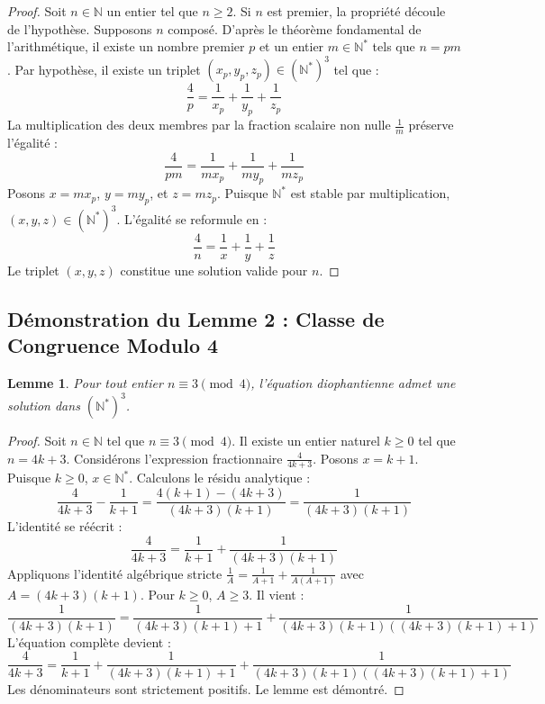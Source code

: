\documentclass[12pt,a4paper]{article}
\newtheorem{lemma}{Lemme}
\begin{document}
\begin{proof}
Soit $n \in \mathbb{N}$ un entier tel que $n \geq 2$.
Si $n$ est premier, la propriété découle de l'hypothèse.
Supposons $n$ composé. D'après le théorème fondamental de l'arithmétique, il existe un nombre premier $p$ et un entier $m \in \mathbb{N}^*$ tels que $n = p m$.
Par hypothèse, il existe un triplet $(x_p, y_p, z_p) \in (\mathbb{N}^*)^3$ tel que :
\begin{equation}
\frac{4}{p} = \frac{1}{x_p} + \frac{1}{y_p} + \frac{1}{z_p}
\end{equation}
La multiplication des deux membres par la fraction scalaire non nulle $\frac{1}{m}$ préserve l'égalité :
\begin{equation}
\frac{4}{pm} = \frac{1}{m x_p} + \frac{1}{m y_p} + \frac{1}{m z_p}
\end{equation}
Posons $x = m x_p$, $y = m y_p$, et $z = m z_p$. Puisque $\mathbb{N}^*$ est stable par multiplication, $(x, y, z) \in (\mathbb{N}^*)^3$. L'égalité se reformule en :
\begin{equation}
\frac{4}{n} = \frac{1}{x} + \frac{1}{y} + \frac{1}{z}
\end{equation}
Le triplet $(x, y, z)$ constitue une solution valide pour $n$.
\end{proof}

\subsection{Démonstration du Lemme 2 : Classe de Congruence Modulo 4}

\begin{lemma}
Pour tout entier $n \equiv 3 \pmod 4$, l'équation diophantienne admet une solution dans $(\mathbb{N}^*)^3$.
\end{lemma}

\begin{proof}
Soit $n \in \mathbb{N}$ tel que $n \equiv 3 \pmod 4$. Il existe un entier naturel $k \geq 0$ tel que $n = 4k + 3$.
Considérons l'expression fractionnaire $\frac{4}{4k+3}$. Posons $x = k+1$. Puisque $k \geq 0$, $x \in \mathbb{N}^*$.
Calculons le résidu analytique :
\begin{equation}
\frac{4}{4k+3} - \frac{1}{k+1} = \frac{4(k+1) - (4k+3)}{(4k+3)(k+1)} = \frac{1}{(4k+3)(k+1)}
\end{equation}
L'identité se réécrit :
\begin{equation}
\frac{4}{4k+3} = \frac{1}{k+1} + \frac{1}{(4k+3)(k+1)}
\end{equation}
Appliquons l'identité algébrique stricte $\frac{1}{A} = \frac{1}{A+1} + \frac{1}{A(A+1)}$ avec $A = (4k+3)(k+1)$. Pour $k \geq 0$, $A \geq 3$.
Il vient :
\begin{equation}
\frac{1}{(4k+3)(k+1)} = \frac{1}{(4k+3)(k+1)+1} + \frac{1}{(4k+3)(k+1)((4k+3)(k+1)+1)}
\end{equation}
L'équation complète devient :
\begin{equation}
\frac{4}{4k+3} = \frac{1}{k+1} + \frac{1}{(4k+3)(k+1)+1} + \frac{1}{(4k+3)(k+1)((4k+3)(k+1)+1)}
\end{equation}
Les dénominateurs sont strictement positifs. Le lemme est démontré.
\end{proof}
\end{document}
